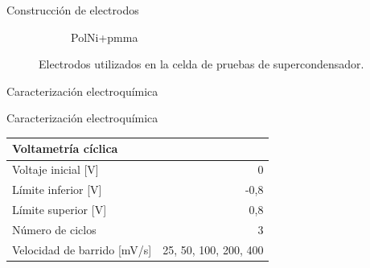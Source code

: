 \documentclass{beamer}
\begin{document}
\begin{frame}{Construcción de electrodos}
\begin{figure}
\begin{adjustbox}{minipage=\linewidth,frame}
{\begin{subfigure}[b]{\electrodesWidth}
					\caption{PolNi+pmma}
					\label{fig:electrode_powder_pmma_ni}
				\end{subfigure}}
			\end{adjustbox}
			\caption[Electrodos utilizados en la celda de pruebas de supercondensador]{Electrodos utilizados en la celda de pruebas de supercondensador.}
			\label{fig:electrodes}
		\end{figure}
	\end{frame}
	
	\begin{frame}[fragile]{Caracterización electroquímica}
		\begin{figure}
		\end{figure}
	\end{frame}

	\begin{frame}{Caracterización electroquímica}
		\begin{table}[h!]
			\centering
			\begin{tabular}{ l r }
				Voltametría cíclica &  \\
				\hline
				Voltaje inicial [V] & 0 \\
				Límite inferior [V] & -0,8 \\
				Límite superior [V] & 0,8  \\
				Número de ciclos & 3 \\
				Velocidad de barrido [mV/s] & 25, 50, 100, 200, 400
			\end{tabular}
		\end{table}
	\end{frame}
\end{document}
